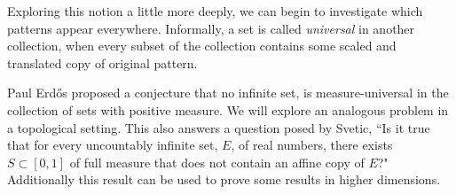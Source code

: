 Exploring this notion a little more deeply, we can begin to investigate which patterns appear everywhere.  Informally, a set is called \textit{universal} in another collection, when every subset of the collection contains some scaled and translated copy of original pattern.  

  Paul Erd\H{o}s proposed a conjecture that no infinite set, is measure-universal in  the collection of sets with positive measure.  We will explore an analogous problem in a topological setting.   This also answers a question posed by Svetic\cite{Svetic}, ``Is it true that for every uncountably infinite set, $E$, of real numbers, there exists $S \subset [0,1]$ of full measure that does not contain an affine copy of $E$?"  Additionally this result can be used to prove some results in higher dimensions.  






